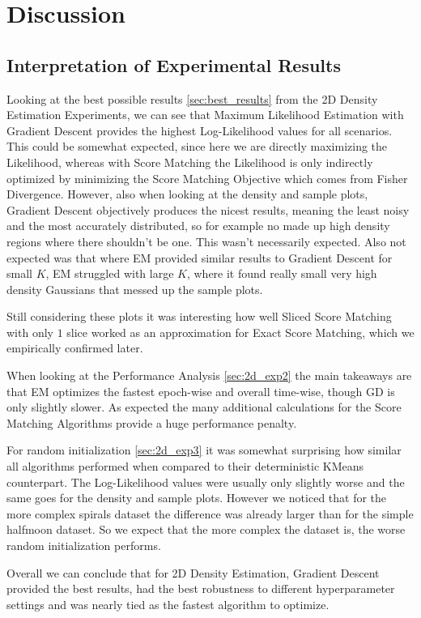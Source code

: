 \chapter{Discussion}
\label{cha:discussion}

\section{Interpretation of Experimental Results}

Looking at the best possible results \ref{sec:best_results} from the 2D Density Estimation Experiments, we can see that
Maximum Likelihood Estimation with Gradient Descent provides the highest Log-Likelihood values for all scenarios. 
This could be somewhat expected, since here we are directly maximizing the Likelihood, whereas with Score Matching the Likelihood
is only indirectly optimized by minimizing the Score Matching Objective which comes from Fisher Divergence. 
However, also when looking at the density and sample plots, Gradient Descent objectively produces the nicest results, meaning the least 
noisy and the most accurately distributed, so for example no made up high density regions where there shouldn't be one. 
This wasn't necessarily expected.  
Also not expected was that where EM provided similar results to Gradient Descent for small $K$, EM struggled with large $K$, where it found
really small very high density Gaussians that messed up the sample plots. 

Still considering these plots it was interesting how well Sliced Score Matching with only $1$ slice worked as an approximation for Exact Score Matching,
which we empirically confirmed later. 

When looking at the Performance Analysis \ref{sec:2d_exp2} the main takeaways are that EM optimizes the fastest epoch-wise and overall time-wise, 
though GD is only slightly slower. As expected the many additional calculations for the Score Matching Algorithms provide a huge 
performance penalty. 

For random initialization \ref{sec:2d_exp3} it was somewhat surprising how similar all algorithms performed when compared 
to their deterministic KMeans counterpart. The Log-Likelihood
values were usually only slightly worse and the same goes for the density and sample plots. However we noticed that for the more 
complex spirals dataset the difference was already larger than for the simple halfmoon dataset. So we expect that the more complex 
the dataset is, the worse random initialization performs.  

Overall we can conclude that for 2D Density Estimation, Gradient Descent provided the best results, had the best robustness to 
different hyperparameter settings and was nearly tied as the fastest algorithm to optimize. 